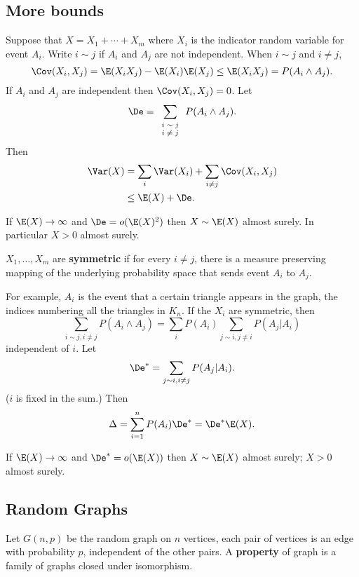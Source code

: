 
\subsection{More bounds}

Suppose that $X=X_1+\cdots +X_m$ where $X_i$ is the indicator random variable for event $A_i$. Write $i\sim j$ if $A_i$ and $A_j$ are not independent. When $i\sim j$ and $i\neq j$,
\[
\Cov(X_i,X_j)=\E(X_iX_j)-\E(X_i)\E(X_j)\leq \E(X_iX_j)=P(A_i\wedge A_j).
\]
If $A_i$ and $A_j$ are independent then $\Cov(X_i,X_j)=0$. Let \[\De=\sum_{\scriptsize\begin{array}{c}i\sim j\\i\neq j\end{array}} P(A_i\wedge A_j).\] Then
\begin{align*}
\Var(X)&=\sum_{i} \Var(X_i) +\sum_{i\neq j} \Cov(X_i,X_j)\\
&\leq \E(X)+\De.
\end{align*}
\begin{cor}%
If $\E(X)\to \infty$ and $\De=o(\E(X)^2)$ then $X\sim \E(X)$ almost surely. In particular $X>0$ almost surely.
\end{cor}
\begin{df}
$X_1,\ldots, X_m$ are \textbf{symmetric} if for every $i\neq j$, there is a measure preserving mapping of the underlying probability space that sends event $A_i$ to $A_j$.
\end{df}
For example, $A_i$ is the event that a certain triangle appears in the graph, the indices numbering all the triangles in $K_n$.
If the $X_i$ are symmetric, then 
\[
\sum_{i\sim j,i\neq j} P(A_i\wedge A_j)=\sum_{i}P(A_i)\sum_{j\sim i,j\neq i} P(A_j|A_i)
\]
independent of $i$. Let
\[
\De^*=\sum_{j\sim i, i\neq j} P(A_j|A_i).
\]
($i$ is fixed in the sum.)
Then
\[
\Delta
=\sum_{i=1}^n P(A_i)\De^*
=\De^*\E(X).
\]
\begin{cor}\label{destar}
If $\E(X)\to \infty$ and $\De^*=o(\E(X))$ then $X\sim \E(X)$ almost surely; $X>0$ almost surely.
\end{cor}

\subsection{Random Graphs}
Let $G(n,p)$ be the random graph on $n$ vertices, each pair of vertices is an edge with probability $p$, independent of the other pairs. A \textbf{property} of graph is a family of graphs closed under isomorphism.


